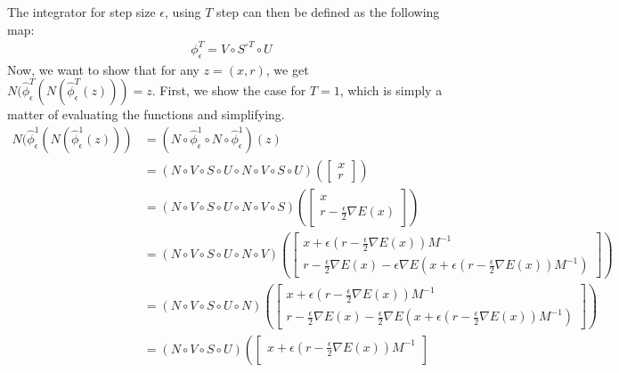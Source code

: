 The integrator for step size $\epsilon$, using $T$ step can then be defined as the following map:
\begin{align*}
    \phi^T_\epsilon = V\circ S^{\circ T} \circ U
\end{align*}
Now, we want to show that for any $z=(x, r)$, we get $N(\hat{\phi}^T_\epsilon(N(\hat{\phi}^T_\epsilon(z))) = z$.
First, we show the case for $T=1$, which is simply a matter of evaluating the functions and simplifying.
\begin{equation}
    \begin{aligned}
        N (\hat{\phi}^1_\epsilon(N(\hat{\phi}^1_\epsilon(z))) 
        &=
        (N \circ \hat{\phi}^1_\epsilon \circ N \circ \hat{\phi}^1_\epsilon)(z) \\
        &= (N \circ V \circ S \circ U \circ N \circ V \circ S \circ U )\left( 
        \begin{bmatrix}
            x \\ r
        \end{bmatrix}
        \right) \\
        &= (N\circ V \circ S \circ U \circ N \circ V\circ S) \left(
        \begin{bmatrix}
            x \\ r - \frac{\epsilon}{2} \nabla E(x)
        \end{bmatrix}
        \right) \\
        &= (N\circ V \circ S \circ U \circ N \circ V )\left(
        \begin{bmatrix}
            x + \epsilon (r - \frac{\epsilon}{2} \nabla E(x)) M^{-1} \\ 
            r - \frac{\epsilon}{2} \nabla E(x) - \epsilon \nabla E(x + \epsilon (r - \frac{\epsilon}{2} \nabla E(x)) M^{-1})
        \end{bmatrix}
        \right) \\
        &= (N\circ V \circ S \circ U \circ N )\left(
        \begin{bmatrix}
            x + \epsilon (r - \frac{\epsilon}{2} \nabla E(x)) M^{-1} \\ 
            r - \frac{\epsilon}{2} \nabla E(x) - \frac{\epsilon}{2} \nabla E(x + \epsilon (r - \frac{\epsilon}{2} \nabla E(x)) M^{-1})
        \end{bmatrix}
        \right) \\
        &= (N\circ V \circ S \circ U )\left(
        \begin{bmatrix}
            x + \epsilon (r - \frac{\epsilon}{2} \nabla E(x)) M^{-1} \\ 

\end{bmatrix}
\end{aligned}
\end{equation}

